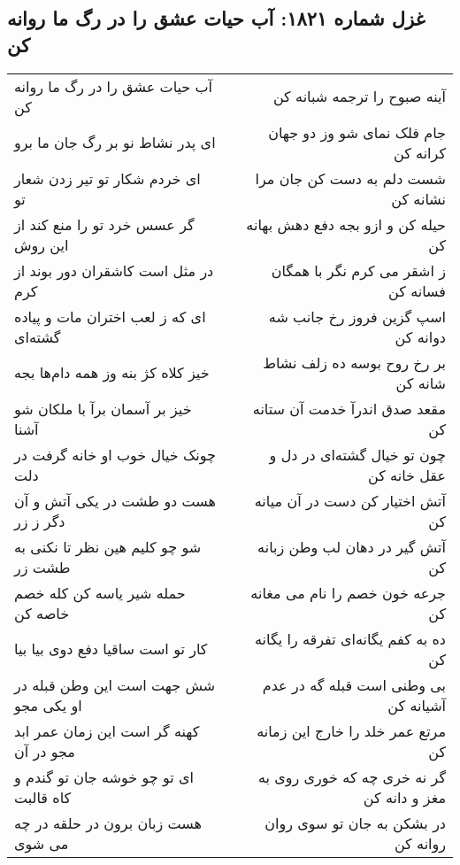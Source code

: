 \begin{center}
\section*{غزل شماره ۱۸۲۱: آب حیات عشق را در رگ ما روانه کن}
\label{sec:1821}
\begin{longtable}{l p{0.5cm} r}
آب حیات عشق را در رگ ما روانه کن
&&
آینه صبوح را ترجمه شبانه کن
\\
ای پدر نشاط نو بر رگ جان ما برو
&&
جام فلک نمای شو وز دو جهان کرانه کن
\\
ای خردم شکار تو تیر زدن شعار تو
&&
شست دلم به دست کن جان مرا نشانه کن
\\
گر عسس خرد تو را منع کند از این روش
&&
حیله کن و ازو بجه دفع دهش بهانه کن
\\
در مثل است کاشقران دور بوند از کرم
&&
ز اشقر می کرم نگر با همگان فسانه کن
\\
ای که ز لعب اختران مات و پیاده گشته‌ای
&&
اسپ گزین فروز رخ جانب شه دوانه کن
\\
خیز کلاه کژ بنه وز همه دام‌ها بجه
&&
بر رخ روح بوسه ده زلف نشاط شانه کن
\\
خیز بر آسمان برآ با ملکان شو آشنا
&&
مقعد صدق اندرآ خدمت آن ستانه کن
\\
چونک خیال خوب او خانه گرفت در دلت
&&
چون تو خیال گشته‌ای در دل و عقل خانه کن
\\
هست دو طشت در یکی آتش و آن دگر ز زر
&&
آتش اختیار کن دست در آن میانه کن
\\
شو چو کلیم هین نظر تا نکنی به طشت زر
&&
آتش گیر در دهان لب وطن زبانه کن
\\
حمله شیر یاسه کن کله خصم خاصه کن
&&
جرعه خون خصم را نام می مغانه کن
\\
کار تو است ساقیا دفع دوی بیا بیا
&&
ده به کفم یگانه‌ای تفرقه را یگانه کن
\\
شش جهت است این وطن قبله در او یکی مجو
&&
بی وطنی است قبله گه در عدم آشیانه کن
\\
کهنه گر است این زمان عمر ابد مجو در آن
&&
مرتع عمر خلد را خارج این زمانه کن
\\
ای تو چو خوشه جان تو گندم و کاه قالبت
&&
گر نه خری چه که خوری روی به مغز و دانه کن
\\
هست زبان برون در حلقه در چه می شوی
&&
در بشکن به جان تو سوی روان روانه کن
\\
\end{longtable}
\end{center}
